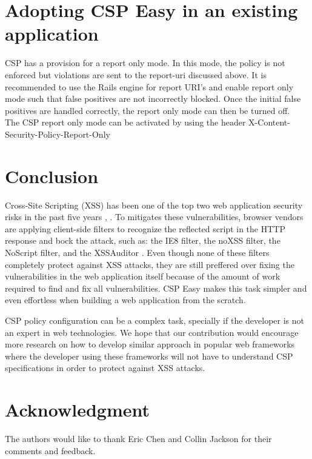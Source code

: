 \documentclass[10pt, conference, compsocconf]{IEEEtran}
\begin{document}
\section{Adopting CSP Easy in an existing application} %
\label{sec:adopting_csp_easy_in_an_existing_application}
CSP has a provision for a report only mode. In this mode, the policy is not enforced but violations are sent to the report-uri discussed above. It is recommended to use the Rails engine for report URI's and enable report only mode such that false positives are not incorrectly blocked. Once the initial false positives are handled correctly, the report only mode can then be turned off.
\\
The CSP report only mode can be activated by using the header X-Content-Security-Policy-Report-Only



\section{Conclusion}

Cross-Site Scripting (XSS) has been one of the top two web application security risks in the past five years \cite{IEEEhowto:owasp2}, \cite{IEEEhowto:owasp3}. To mitigates these vulnerabilities, browser vendors are applying client-side filters to recognize the reflected script in the HTTP response and bock the attack, such as: the IE8 filter, the noXSS filter, the NoScript filter, and the XSSAuditor \cite{IEEEhowto:regex}. Even though none of these filters completely protect against XSS attacks, they are still preffered over fixing the vulnerabilities in the web application itself because of the amount of work required to find and fix all vulnerabilities. CSP Easy makes this task simpler and even effortless when building a web application from the scratch. 

CSP policy configuration can be a complex task, specially if the developer is not an expert in web technologies. We hope that our contribution would encourage more research on how to develop similar approach in popular web frameworks where the developer using these frameworks will not have to understand CSP specifications in order to protect against XSS attacks.

\section*{Acknowledgment}
The authors would like to thank Eric Chen and Collin Jackson for their comments and feedback.
\end{document}
